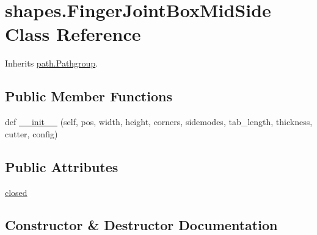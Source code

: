 \hypertarget{classshapes_1_1_finger_joint_box_mid_side}{}\section{shapes.\+Finger\+Joint\+Box\+Mid\+Side Class Reference}
\label{classshapes_1_1_finger_joint_box_mid_side}


Inherits \hyperlink{classpath_1_1_pathgroup}{path.\+Pathgroup}.

\subsection*{Public Member Functions}
\begin{DoxyCompactItemize}
\item 
def \hyperlink{classshapes_1_1_finger_joint_box_mid_side_a1ea61073dc9e25ef8becce4b843bd15d}{\+\_\+\+\_\+init\+\_\+\+\_\+} (self, pos, width, height, corners, sidemodes, tab\+\_\+length, thickness, cutter, config)
\end{DoxyCompactItemize}
\subsection*{Public Attributes}
\begin{DoxyCompactItemize}
\item 
\hyperlink{classshapes_1_1_finger_joint_box_mid_side_ade09659acbf36dd004378c4ccc40f9eb}{closed}
\end{DoxyCompactItemize}


\subsection{Constructor \& Destructor Documentation}
\hypertarget{classshapes_1_1_finger_joint_box_mid_side_a1ea61073dc9e25ef8becce4b843bd15d}{}
